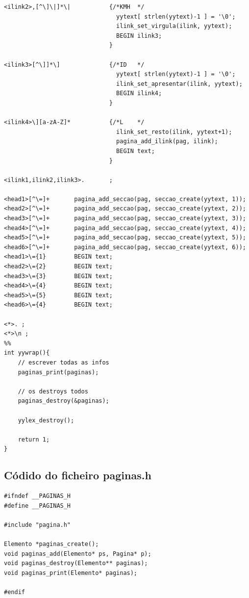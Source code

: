 \documentclass[11pt, a4paper, oneside]{article}
\begin{document}
\begin{verbatim}
<ilink2>,[^\]\|]*\|           {/*KMH  */
                                yytext[ strlen(yytext)-1 ] = '\0';
                                ilink_set_virgula(ilink, yytext);
                                BEGIN ilink3;
                              }

<ilink3>[^\]]*\]              {/*ID   */
                                yytext[ strlen(yytext)-1 ] = '\0';
                                ilink_set_apresentar(ilink, yytext);
                                BEGIN ilink4;
                              }

<ilink4>\][a-zA-Z]*           {/*L    */
                                ilink_set_resto(ilink, yytext+1);
                                pagina_add_ilink(pag, ilink);
                                BEGIN text;
                              }

<ilink1,ilink2,ilink3>.       ;

<head1>[^\=]+       pagina_add_seccao(pag, seccao_create(yytext, 1));
<head2>[^\=]+       pagina_add_seccao(pag, seccao_create(yytext, 2));
<head3>[^\=]+       pagina_add_seccao(pag, seccao_create(yytext, 3));
<head4>[^\=]+       pagina_add_seccao(pag, seccao_create(yytext, 4));
<head5>[^\=]+       pagina_add_seccao(pag, seccao_create(yytext, 5));
<head6>[^\=]+       pagina_add_seccao(pag, seccao_create(yytext, 6));
<head1>\={1}        BEGIN text;
<head2>\={2}        BEGIN text;
<head3>\={3}        BEGIN text;
<head4>\={4}        BEGIN text;
<head5>\={5}        BEGIN text;
<head6>\={4}        BEGIN text;

<*>. ;
<*>\n ;
%%
int yywrap(){
    // escrever todas as infos
    paginas_print(paginas);

    // os destroys todos
    paginas_destroy(&paginas);
    
    yylex_destroy();

    return 1;
}

\end{verbatim}
\newpage
\newpage
\subsection{Códido do ficheiro paginas.h}
\begin{verbatim}
#ifndef __PAGINAS_H
#define __PAGINAS_H

#include "pagina.h"

Elemento *paginas_create();
void paginas_add(Elemento* ps, Pagina* p);
void paginas_destroy(Elemento** paginas);
void paginas_print(Elemento* paginas);

#endif

\end{verbatim}
\end{document}
